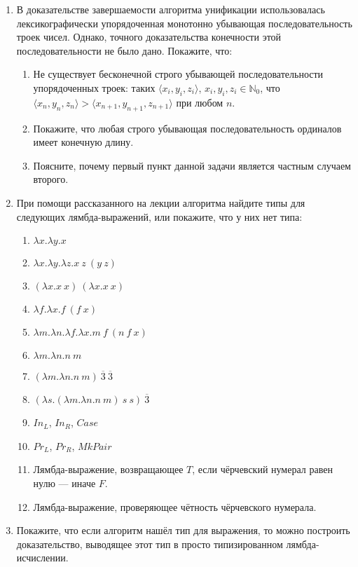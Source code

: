 \documentclass[10pt,a4paper,oneside]{article}
\begin{document}
\begin{enumerate}
\begin{enumerate}
\end{enumerate}

\item В доказательстве завершаемости алгоритма унификации использовалась лексикографически
упорядоченная монотонно убывающая последовательность троек чисел. Однако, точного доказательства
конечности этой последовательности не было дано. Покажите, что:

\begin{enumerate}
\item Не существует бесконечной строго убывающей последовательности упорядоченных троек:
таких $\langle x_i, y_i, z_i\rangle$, $x_i,y_i,z_i \in\mathbb{N}_0$, что
$\langle x_n, y_n, z_n\rangle > \langle x_{n+1}, y_{n+1}, z_{n+1} \rangle$ при любом $n$.
\item Покажите, что любая строго убывающая последовательность ординалов имеет конечную длину.
\item Поясните, почему первый пункт данной задачи является частным случаем второго.
\end{enumerate}

\item При помощи рассказанного на лекции алгоритма найдите типы для следующих лямбда-выражений, или покажите,
что у них нет типа:
\begin{enumerate}
\item $\lambda x.\lambda y.x$
\item $\lambda x.\lambda y.\lambda z.x\ z\ (y\ z)$
\item $(\lambda x.x\ x)\ (\lambda x.x\ x)$
\item $\lambda f.\lambda x.f\ (f\ x)$
\item $\lambda m.\lambda n.\lambda f.\lambda x.m\ f\ (n\ f\ x)$
\item $\lambda m.\lambda n.n\ m$
\item $(\lambda m.\lambda n.n\ m)\ \overline{3}\ \overline{3}$
\item $(\lambda s.(\lambda m.\lambda n.n\ m)\ s\ s)\ \overline{3}$
\item $In_L$, $In_R$, $Case$
\item $Pr_L$, $Pr_R$, $MkPair$
\item Лямбда-выражение, возвращающее $T$, если чёрчевский нумерал равен нулю --- иначе $F$.
\item Лямбда-выражение, проверяющее чётность чёрчевского нумерала.
\end{enumerate}

\item Покажите, что если алгоритм нашёл тип для выражения, то можно построить доказательство,
выводящее этот тип в просто типизированном лямбда-исчислении.


\end{enumerate}
\end{document}
